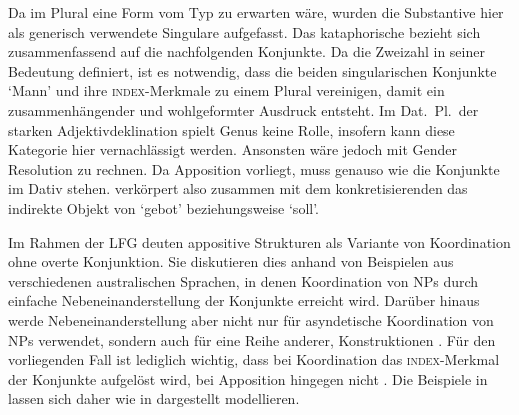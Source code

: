 Da im Plural eine Form vom Typ  zu erwarten wäre, wurden die
Substantive hier als generisch verwendete Singulare aufgefasst. Das
kataphorische  bezieht sich zusammenfassend auf die nachfolgenden
Konjunkte. Da  die Zweizahl in seiner Bedeutung definiert, ist es
notwendig, dass die beiden singularischen Konjunkte  `Mann' und
 ihre \textsc{index}-Merkmale zu einem Plural vereinigen, damit ein
zusammenhängender und wohlgeformter Ausdruck entsteht. Im Dat.~Pl.\ der starken
Adjektivdeklination spielt Genus keine Rolle, insofern kann diese Kategorie
hier vernachlässigt werden. Ansonsten wäre jedoch mit Gender Resolution zu
rechnen. Da Apposition vorliegt, muss  genauso wie die Konjunkte im
Dativ stehen.  verkörpert also zusammen mit dem konkretisierenden
 das indirekte Objekt von  `gebot'
beziehungsweise  `soll'.

Im Rahmen der LFG deuten \citet{sadlernordlinger2006} appositive Strukturen als
Variante von Koordination ohne overte Konjunktion. Sie diskutieren dies anhand
von Beispielen aus verschiedenen australischen Sprachen, in denen Koordination
von NPs durch einfache Nebeneinanderstellung der Konjunkte erreicht wird.
Darüber hinaus werde Nebeneinanderstellung aber nicht nur für asyndetische
Koordination von NPs verwendet, sondern auch für eine Reihe anderer,
 Konstruktionen
\autocite[440--441]{sadlernordlinger2006}. Für den vorliegenden Fall ist
lediglich wichtig, dass bei Koordination das \textsc{index}-Merkmal der
Konjunkte aufgelöst wird, bei Apposition hingegen nicht
\autocite[444]{sadlernordlinger2006}. Die Beispiele in
 lassen sich daher wie in
 dargestellt modellieren.

